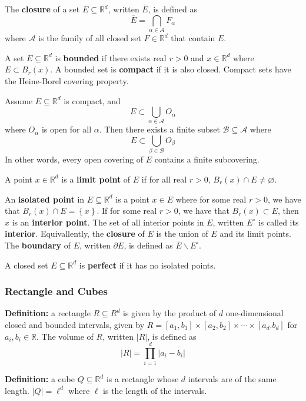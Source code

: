 \documentclass[12pt]{article}
\newcommand{\R}{\mathbb{R}}
\newcommand{\braceb}[1]{\left\{#1\right\}}
\newcommand{\vertb}[1]{\left\vert#1\right\vert}
\begin{document}
The \textbf{closure} of a set \( E \subseteq \R^d \), written
\( \overline{E} \), is defined as
\[
	\overline{E} = \bigcap_{\alpha \in \mathcal{A}} F_\alpha
\]
where \( \mathcal{A} \) is the family of all closed set \( F \in \R^d \) that
contain \( E \).

A set \( E \subseteq \R^d \) is \textbf{bounded} if there exists real
\( r > 0 \) and \( x \in \R^d \) where \( E \subset B_r(x) \).
A bounded set is \textbf{compact} if it is also closed.
Compact sets have the Heine-Borel covering property.

Assume \( E \subseteq \R^d \) is compact, and
\[
	E \subset \bigcup_{\alpha \in \mathcal{A}} O_\alpha
\]
where \( O_\alpha \) is open for all \( \alpha \).
Then there exists a finite subset \( \mathcal{B} \subseteq \mathcal{A} \)
where
\[
	E \subset \bigcup_{\beta \in \mathcal{B}} O_\beta
\]
In other words, every open covering of \( E \) contains a finite
subcovering.

A point \( x \in \R^d \) is a \textbf{limit point} of \( E \) if for all real
\( r > 0 \), \( B_r(x) \cap E \ne \varnothing \).

An \textbf{isolated point} in \( E \subseteq \R^d \) is a point \( x \in E \)
where for some real \( r > 0 \), we have that \( B_r(x) \cap E = \braceb{x} \).
If for some real \( r > 0 \), we have that \( B_r(x) \subset E \), then \( x \)
is an \textbf{interior point}.
The set of all interior points in \( E \), written \( E^\circ \) is called its
\textbf{interior}. Equivallently, the \textbf{closure} of \( E \) is the union
of \( E \) and its limit points.
The \textbf{boundary} of \( E \), written \( \partial E \), is defined as
\( \overline{E} \backslash E^\circ \).

A closed set \( E \subseteq \R^d \) is \textbf{perfect} if it has no isolated
points.

\subsubsection*{Rectangle and Cubes}

\textbf{Definition:} a rectangle \( R \subseteq R^d \) is given by the product
of \( d \) one-dimensional closed and bounded intervals, given by
\( R = [a_1, b_1] \times [a_2, b_2] \times \cdots \times [a_d. b_d] \) for
\( a_i, b_i \in \R \).
The volume of \( R \), written \( \vertb{R} \), is defined as
\[
	\vertb{R} = \prod_{i = 1}^d \vertb{a_i - b_i}
\]

\textbf{Definition:} a cube \( Q \subseteq \R^d \) is a rectangle whose
\( d \) intervals are of the same length. \( \vertb{Q} = \ell^d \) where
\( \ell \) is the length of the intervals.
\end{document}
